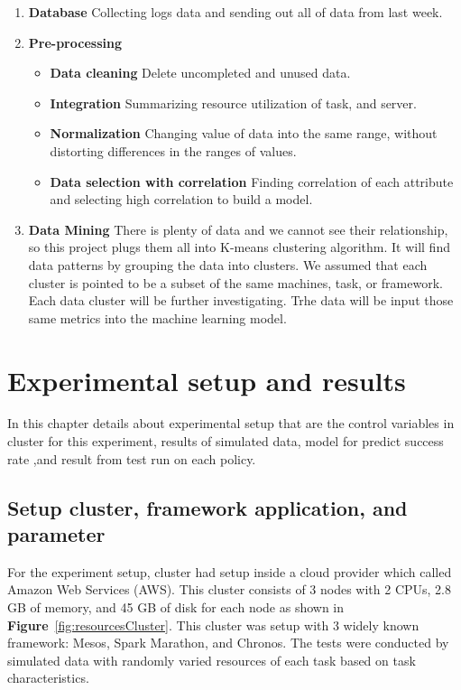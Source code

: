 \documentclass[12pt,oneside,openright,a4paper]{cpe-english-project}
\begin{document}
\begin{enumerate}
  \item \textbf{Database} Collecting logs data and sending out all of data from last week.
  \item \textbf{Pre-processing}
    \begin{itemize}
      \item \textbf{Data cleaning } Delete uncompleted and unused data. 
      \item \textbf{Integration } Summarizing resource utilization of task, and server.
      \item \textbf{Normalization } Changing value of data into the same range, without distorting differences in the ranges of values.
      \item \textbf{Data selection with correlation } Finding correlation of each attribute and selecting high correlation to build a model.
    \end{itemize}
  \item \textbf{Data Mining } There is plenty of data and we cannot see their relationship, so this project plugs them all into K-means clustering algorithm. It will find data patterns by grouping the data into clusters. We assumed that each cluster is pointed to be a subset of the same machines, task, or framework. Each data cluster will be further investigating. Trhe data will be input those same metrics into the machine learning model.
\end{enumerate}
\chapter{Experimental setup and results}

\hspace{10mm} In this chapter details about experimental setup that are the control variables in cluster for this experiment, results of simulated data, model for predict success rate ,and result from test run on each policy.

\section{Setup cluster, framework application, and parameter}
\hspace{10mm}For the experiment setup, cluster had setup inside a cloud provider which called Amazon Web Services (AWS). This cluster consists of 3 nodes with 2 CPUs, 2.8 GB of memory, and 45 GB of disk for each node as shown in \textbf{Figure}~\ref{fig:resourcesCluster}. This cluster was setup with 3 widely known framework: Mesos, Spark Marathon, and Chronos. The tests were conducted by simulated data with randomly varied resources of each task based on task characteristics. 
\end{document}
